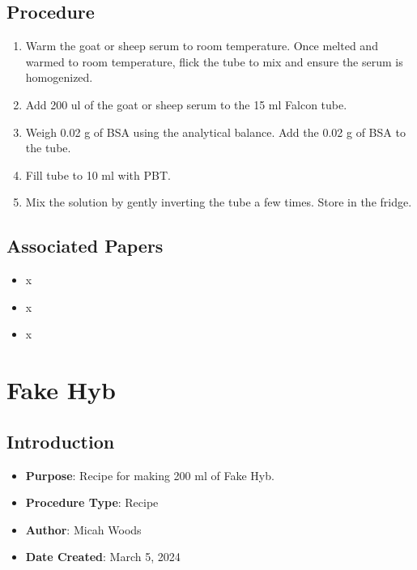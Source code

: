 \documentclass[
  letterpaper,
  DIV=11,
  numbers=noendperiod]{scrreprt}
\providecommand{\tightlist}{%
  \setlength{\itemsep}{0pt}\setlength{\parskip}{0pt}}\usepackage{longtable,booktabs,array}
\begin{document}
\hypertarget{procedure-94}{%
\section{Procedure}\label{procedure-94}}

\begin{enumerate}
\def\labelenumi{\arabic{enumi}.}
\item
  Warm the goat or sheep serum to room temperature. Once melted and
  warmed to room temperature, flick the tube to mix and ensure the serum
  is homogenized.
\item
  Add 200 ul of the goat or sheep serum to the 15 ml Falcon tube.
\item
  Weigh 0.02 g of BSA using the analytical balance. Add the 0.02 g of
  BSA to the tube.
\item
  Fill tube to 10 ml with PBT.
\item
  Mix the solution by gently inverting the tube a few times. Store in
  the fridge.
\end{enumerate}

\hypertarget{associated-papers-68}{%
\section{Associated Papers}\label{associated-papers-68}}

\begin{itemize}
\tightlist
\item
  x
\item
  x
\item
  x
\end{itemize}

\hypertarget{sec-recipe-fake_hyb}{%
\chapter{Fake Hyb}\label{sec-recipe-fake_hyb}}

\hypertarget{introduction-100}{%
\section{Introduction}\label{introduction-100}}

\begin{itemize}
\tightlist
\item
  \textbf{Purpose}: Recipe for making 200 ml of Fake Hyb.
\item
  \textbf{Procedure Type}: Recipe
\item
  \textbf{Author}: Micah Woods
\item
  \textbf{Date Created}: March 5, 2024
\end{itemize}
\end{document}
